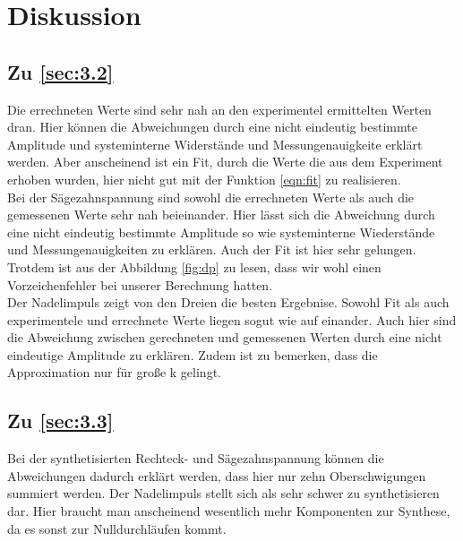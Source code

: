 \section{Diskussion}
\label{sec:Diskussion}

\subsection{Zu \ref{sec:3.2}}
Die errechneten Werte sind sehr nah an den experimentel ermittelten Werten dran.
Hier können die Abweichungen durch eine nicht eindeutig bestimmte Amplitude und
systeminterne Widerstände und Messungenauigkeite erklärt werden. Aber anscheinend ist ein Fit, durch die
Werte die aus dem Experiment erhoben wurden, hier nicht gut mit der Funktion \eqref{eqn:fit}
 zu realisieren. \\
 Bei der Sägezahnspannung sind sowohl die errechneten Werte als auch die gemessenen
 Werte sehr nah beieinander. Hier lässt sich die Abweichung durch eine nicht eindeutig
 bestimmte Amplitude so wie systeminterne Wiederstände und
 Messungenauigkeiten zu erklären. Auch der Fit ist hier sehr gelungen. Trotdem
 ist aus der Abbildung \ref{fig:dp} zu lesen, dass wir wohl einen Vorzeichenfehler
  bei unserer Berechnung hatten. \\
 Der Nadelimpuls zeigt von den Dreien die besten Ergebnise. Sowohl Fit als auch
  experimentele und errechnete Werte liegen sogut wie auf einander. Auch hier sind die
  Abweichung zwischen gerechneten und gemessenen Werten durch eine nicht
  eindeutige Amplitude zu erklären. Zudem ist zu bemerken, dass die
  Approximation nur für große k gelingt.

\subsection{Zu \ref{sec:3.3}}
Bei der synthetisierten Rechteck- und Sägezahnspannung können die Abweichungen
dadurch erklärt werden, dass hier nur zehn Oberschwigungen summiert werden.
Der Nadelimpuls stellt sich als sehr schwer zu synthetisieren dar. Hier braucht
man anscheinend wesentlich mehr Komponenten zur Synthese, da es sonst zur Nulldurchläufen
kommt.
